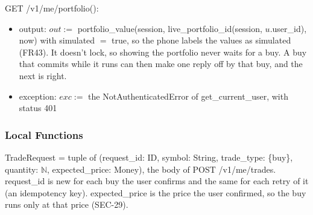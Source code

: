 \documentclass[12pt, titlepage]{article}
\begin{document}
\noindent GET /v1/me/portfolio():
\begin{itemize}
\item output: $out :=$ portfolio\_value(session, live\_portfolio\_id(session,
  $u$.user\_id), now) with simulated $=$ true, so the phone labels the values
  as simulated (FR43). It doesn't lock, so showing the portfolio never waits
  for a buy. A buy that commits while it runs can then make one reply off by
  that buy, and the next is right.
\item exception: $exc :=$ the NotAuthenticatedError of get\_current\_user, with
  status 401
\end{itemize}

\subsubsection{Local Functions}

\noindent TradeRequest = tuple of (request\_id: ID, symbol: String,
trade\_type: \{buy\}, quantity: $\mathbb{N}$, expected\_price: Money), the
body of POST /v1/me/trades. request\_id is new for each buy the user confirms
and the same for each retry of it (an idempotency key). expected\_price is the
price the user confirmed, so the buy runs only at that price (SEC-29).
\end{document}
